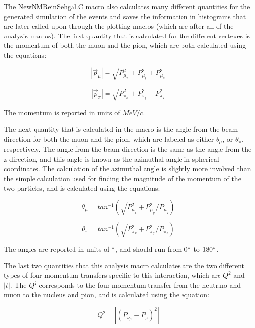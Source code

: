 \documentclass[11pt]{article}
\begin{document}
The NewNMReinSehgal.C macro also calculates many different quantities for the generated simulation of the events and saves the information in histograms that are later called upon through the plotting macros (which are after all of the analysis macros). The first quantity that is calculated for the different vertexes is the momentum of both the muon and the pion, which are both calculated using the equations:

\begin{equation}
|\vec{p}_\mu| = \sqrt{P_{\mu_x}^2 + P_{\mu_y}^2 + P_{\mu_z}^2}
\end{equation}

\begin{equation}
|\vec{p}_\pi| = \sqrt{P_{\pi_x}^2 + P_{\pi_y}^2 + P_{\pi_z}^2}
\end{equation}

\noindent
The momentum is reported in units of $MeV/c$.

The next quantity that is calculated in the macro is the angle from the beam-direction for both the muon and the pion, which are labeled as either $\theta_\mu$, or $\theta_\pi$, respectively. The angle from the beam-direction is the same as the angle from the z-direction, and this angle is known as the azimuthal angle in spherical coordinates. The calculation of the azimuthal angle is slightly more involved than the simple calculation used for finding the magnitude of the momentum of the two particles, and is calculated using the equations:

\begin{equation}
\theta_\mu = tan^{-1}(\sqrt{P_{\mu_x}^2 + P_{\mu_y}^2}/{P_{\mu_z}})
\end{equation}

\begin{equation}
\theta_\pi = tan^{-1}(\sqrt{P_{\pi_x}^2 + P_{\pi_y}^2}/{P_{\pi_z}})
\end{equation}

\noindent
The angles are reported in units of $\degree$, and should run from $0\degree$ to $180\degree$.

The last two quantities that this analysis macro calculates are the two different types of four-momentum transfers specific to this interaction, which are $Q^2$ and $|t|$. The $Q^2$ corresponds to the four-momentum transfer from the neutrino and muon to the nucleus and pion, and is calculated using the equation:

\begin{equation}
Q^2 = |(P_{\nu_\mu} - P_\mu)^2|
\end{equation}
\end{document}
